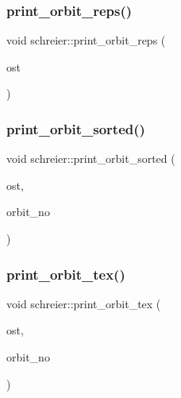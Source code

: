 \mbox{\label{classschreier_aa0c08a86ca9fac0ae4fce8bffd3c7161}} 
\subsubsection{\texorpdfstring{print\+\_\+orbit\+\_\+reps()}{print\_orbit\_reps()}}
{\footnotesize\ttfamily void schreier\+::print\+\_\+orbit\+\_\+reps (\begin{DoxyParamCaption}\item[{ostream \&}]{ost }\end{DoxyParamCaption})}

\mbox{\label{classschreier_a8bd8fc10c3d25da9ac28af1f3aeb3c05}} 
\subsubsection{\texorpdfstring{print\+\_\+orbit\+\_\+sorted()}{print\_orbit\_sorted()}}
{\footnotesize\ttfamily void schreier\+::print\+\_\+orbit\+\_\+sorted (\begin{DoxyParamCaption}\item[{ostream \&}]{ost,  }\item[{\mbox{\hyperlink{galois_8h_a09fddde158a3a20bd2dcadb609de11dc}{I\+NT}}}]{orbit\+\_\+no }\end{DoxyParamCaption})}

\mbox{\label{classschreier_a9a93cee225ebf0f971afb10255422158}} 
\subsubsection{\texorpdfstring{print\+\_\+orbit\+\_\+tex()}{print\_orbit\_tex()}}
{\footnotesize\ttfamily void schreier\+::print\+\_\+orbit\+\_\+tex (\begin{DoxyParamCaption}\item[{ostream \&}]{ost,  }\item[{\mbox{\hyperlink{galois_8h_a09fddde158a3a20bd2dcadb609de11dc}{I\+NT}}}]{orbit\+\_\+no }\end{DoxyParamCaption})}

